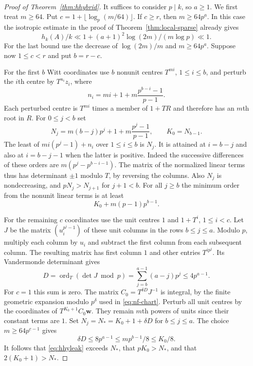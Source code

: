 \documentclass[11pt,letterpaper]{article}
\theoremstyle{definition}
\numberwithin{equation}{section}
\begin{document}
\begin{proof}[Proof of Theorem~\ref{thm:hhybrid}]
It suffices to consider $p\mid k$, so $a\ge1$. We first treat
$m\ge64$. Put $c=1+\lfloor\log_p(m/64)\rfloor$. If $c\ge r$,
then $m\ge64p^a$. In this case the isotropic estimate in the proof of
Theorem~\ref{thm:local-sparse} already gives
\[
     h_k(A)/k\ll 1+(a+1)^2\log(2m)/(m\log p)\ll1.
\]
For the last bound use the decrease of $\log(2m)/m$ and
$m\ge64p^a$. Suppose now $1\le c<r$ and put $b=r-c$.

For the first $b$ Witt coordinates use $b$ nonunit centres
$T^{mi}$, $1\le i\le b$, and perturb the $i$th centre by
$T^{n_i}z_i$, where
\[
   n_i=mi+1+m\frac{p^{b-i}-1}{p-1}.
\]
Each perturbed centre is $T^{mi}$ times a member of $1+TR$ and
therefore has an $m$th root in $R$. For $0\le j<b$ set
\[
 N_j=m(b-j)p^j+1+m\frac{p^j-1}{p-1},\qquad K_0=N_{b-1}.
\]
The least of $mi(p^j-1)+n_i$ over $1\le i\le b$ is $N_j$.
It is attained at $i=b-j$ and also at $i=b-j-1$ when the latter
is positive. Indeed the successive differences of these orders are
$m(p^j-p^{b-i-1})$. The matrix of the normalized linear terms thus
has determinant $\pm1$ modulo $T$, by reversing the columns. Also
$N_j$ is nondecreasing, and $pN_j>N_{j+1}$ for $j+1<b$.
For all $j\ge b$ the minimum order from the nonunit linear terms
is at least
\begin{equation}\label{eq:hhyleak}
                    K_0+m(p-1)p^{b-1}.
\end{equation}

For the remaining $c$ coordinates use the unit centres $1$ and
$1+T^i$, $1\le i<c$. Let $J$ be the matrix $(u_i^{p^j-1})$
of these unit columns in the rows $b\le j\le a$. Modulo $p$,
multiply each column by $u_i$ and subtract the first column from
each subsequent column. The resulting matrix has first column $1$
and other entries $T^{ip^j}$. Its Vandermonde determinant gives
\[
             D=\operatorname{ord}_T(\det J\bmod p)
                      =\sum_{j=b}^{a-1}(a-j)p^j\le4p^{a-1}.
\]
For $c=1$ this sum is zero. The matrix $C_0=T^{\delta D}J^{-1}$
is integral, by the finite geometric expansion modulo $p^\delta$
used in \eqref{eq:nf-chart}. Perturb all unit centres by the
coordinates of $T^{K_0+1}C_0\mathbf w$. They remain $m$th
powers of units since their constant terms are $1$.
Set $N_j=N_*=K_0+1+\delta D$ for $b\le j\le a$.
The choice $m\ge64p^{c-1}$ gives
\[
 \delta D\le8p^{a-1}\le m p^{b-1}/8\le K_0/8 .
\]
It follows that \eqref{eq:hhyleak} exceeds $N_*$,
that $pK_0>N_*$, and that $2(K_0+1)>N_*$.


\end{proof}
\end{document}
